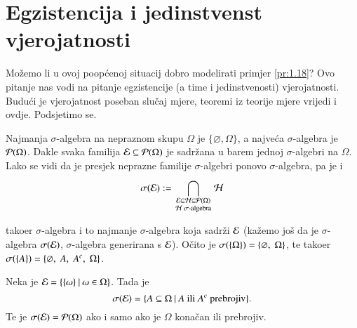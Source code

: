 
\chapter{Egzistencija i jedinstvenst vjerojatnosti}

Mo\v zemo li u ovoj poop\' cenoj situacij dobro modelirati primjer \ref{pr:1.18}?
Ovo pitanje nas vodi na pitanje egzistencije (a time i jedinstvenosti) vjerojatnosti.
Budu\' ci je vjerojatnost poseban slu\v caj mjere, teoremi iz teorije mjere vrijedi i ovdje.
Podsjetimo se.

Najmanja $\sigma$-algebra na nepraznom skupu $\Omega$ je $\{\varnothing, \Omega\}$, a najve\' ca $\sigma$-algebra je $\mathcal{P}({\Omega})$.
Dakle svaka familija $\mathcal{E} \subseteq \mathcal{P}({\Omega})$ je sadr\v zana u barem jednoj $\sigma$-algebri na $\Omega$.
Lako se vidi da je presjek neprazne familije $\sigma$-algebri ponovo $\sigma$-algebra, pa je i
\begin{equation} \label{jed:2.1}
    \sigma({\mathcal{E}}) := \bigcap\limits_{
        \begin{smallmatrix}
            \mathcal{E} \subseteq \mathcal{H} \subseteq \mathcal{P}({\Omega})\\
            \mathcal{H} \; \sigma \textnormal{-algebra}
        \end{smallmatrix}
    }^{} \mathcal{H}
\end{equation}

tako\dj er $\sigma$-algebra i to najmanje $\sigma$-algebra koja sadr\v zi $\mathcal{E}$ (ka\v zemo jo\v s da je $\sigma$-algebra $\sigma({\mathcal{E}})$, $\sigma$-algebra generirana s $\mathcal{E}$).
O\v cito je $\sigma({\{\Omega\}}) = \{ \varnothing, \; \Omega\}$,
te tako\dj er $\sigma({\{A\}}) = \{ \varnothing, \; A, \; A^c, \; \Omega \}$.

\begin{zad} \label{zad:2.2}
    Neka je $\mathcal{E} = \{{\{ \omega \}} \: | \: {\omega \in \Omega}\}$.
    Tada je
    \begin{equation*}
        \sigma({\mathcal{E}}) =\{{A \subseteq \Omega} \: | \: {A \textnormal{ ili } A^c \textnormal{ prebrojiv}}\}.
    \end{equation*}
    Te je $\sigma({\mathcal{E}}) = \mathcal{P}({\Omega})$ ako i samo ako je $\Omega$ kona\v can ili prebrojiv.
\end{zad}

